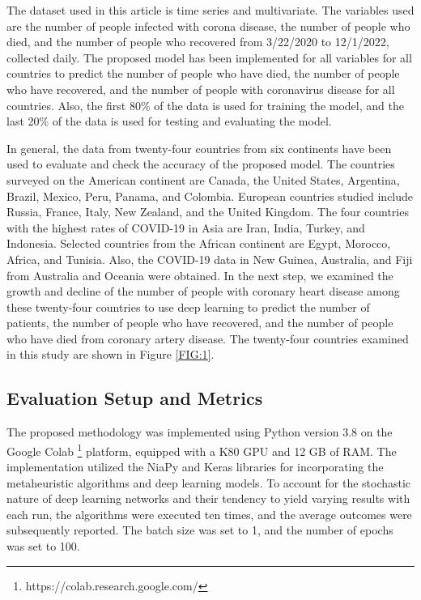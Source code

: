 \documentclass{article}
\begin{document}
The dataset used in this article is time series and multivariate. The variables used are the number of people infected with corona disease, the number of people who died, and the number of people who recovered from 3/22/2020 to 12/1/2022, collected daily. The proposed model has been implemented for all variables for all countries to predict the number of people who have died, the number of people who have recovered, and the number of people with coronavirus disease for all countries. Also, the first 80\% of the data is used for training the model, and the last 20\% of the data is used for testing and evaluating the model.

In general, the data from twenty-four countries from six continents have been used to evaluate and check the accuracy of the proposed model. The countries surveyed on the American continent are Canada, the United States, Argentina, Brazil, Mexico, Peru, Panama, and Colombia. European countries studied include Russia, France, Italy, New Zealand, and the United Kingdom. The four countries with the highest rates of COVID-19 in Asia are Iran, India, Turkey, and Indonesia. Selected countries from the African continent are Egypt, Morocco, Africa, and Tunisia. Also, the COVID-19 data in New Guinea, Australia, and Fiji from Australia and Oceania were obtained. In the next step, we examined the growth and decline of the number of people with coronary heart disease among these twenty-four countries to use deep learning to predict the number of patients, the number of people who have recovered, and the number of people who have died from coronary artery disease. The twenty-four countries examined in this study are shown in Figure \ref{FIG:1}.\\


\subsection{Evaluation Setup and Metrics}
The proposed methodology was implemented using Python version 3.8 on the Google Colab \footnote{https://colab.research.google.com/} platform, equipped with a K80 GPU and 12 GB of RAM. The implementation utilized the NiaPy \cite{NiaPyJOSS2018} and Keras \cite{chollet2015keras} libraries for incorporating the metaheuristic algorithms and deep learning models. To account for the stochastic nature of deep learning networks and their tendency to yield varying results with each run, the algorithms were executed ten times, and the average outcomes were subsequently reported. The batch size was set to 1, and the number of epochs was set to 100.
\end{document}
